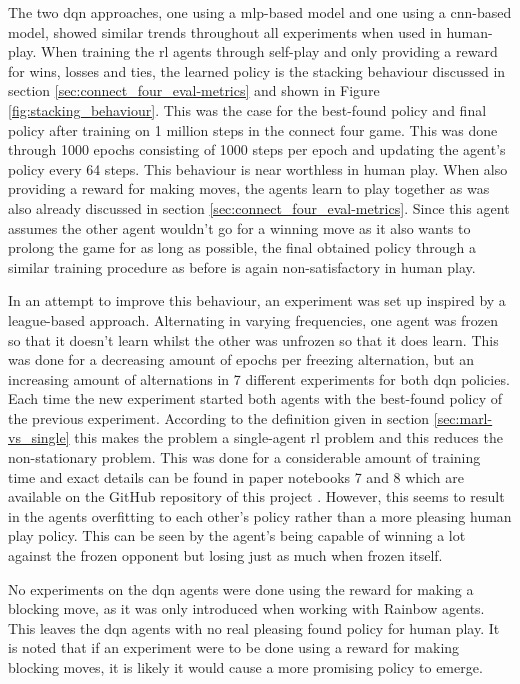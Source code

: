 The two \gls{dqn} approaches, one using a \gls{mlp}-based model and one using a \gls{cnn}-based model, showed similar trends throughout all experiments when used in human-play.
When training the \gls{rl} agents through self-play and only providing a reward for wins, losses and ties, the learned policy is the stacking behaviour discussed in section \ref{sec:connect_four_eval-metrics} and shown in Figure \ref{fig:stacking_behaviour}.
This was the case for the best-found policy and final policy after training on 1 million steps in the connect four game.
This was done through 1000 epochs consisting of 1000 steps per epoch and updating the agent's policy every 64 steps.
This behaviour is near worthless in human play.
When also providing a reward for making moves, the agents learn to play together as was also already discussed in section \ref{sec:connect_four_eval-metrics}.
Since this agent assumes the other agent wouldn't go for a winning move as it also wants to prolong the game for as long as possible, the final obtained policy through a similar training procedure as before is again non-satisfactory in human play.

In an attempt to improve this behaviour, an experiment was set up inspired by a league-based approach.
Alternating in varying frequencies, one agent was frozen so that it doesn't learn whilst the other was unfrozen so that it does learn.
This was done for a decreasing amount of epochs per freezing alternation, but an increasing amount of alternations in 7 different experiments for both \gls{dqn} policies.
Each time the new experiment started both agents with the best-found policy of the previous experiment.
According to the definition given in section \ref{sec:marl-vs_single} this makes the problem a single-agent \gls{rl} problem and this reduces the non-stationary problem.
This was done for a considerable amount of training time and exact details can be found in paper notebooks 7 and 8 which are available on the GitHub repository of this project \citep{github_project}.
However, this seems to result in the agents overfitting to each other's policy rather than a more pleasing human play policy.
This can be seen by the agent's being capable of winning a lot against the frozen opponent but losing just as much when frozen itself.

No experiments on the \gls{dqn} agents were done using the reward for making a blocking move, as it was only introduced when working with Rainbow agents.
This leaves the \gls{dqn} agents with no real pleasing found policy for human play.
It is noted that if an experiment were to be done using a reward for making blocking moves, it is likely it would cause a more promising policy to emerge.

